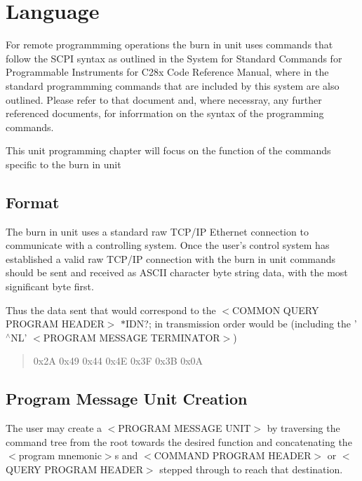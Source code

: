 \hypertarget{a00001_lang}{}\section{Language}\label{a00001_lang}
For remote programmming operations the burn in unit uses commands that follow the S\-C\-P\-I syntax as outlined in the System for Standard Commands for Programmable Instruments for C28x Code Reference Manual, where in the standard programmming commands that are included by this system are also outlined. Please refer to that document and, where necessray, any further referenced documents, for inforrmation on the syntax of the programming commands.

This unit programming chapter will focus on the function of the commands specific to the burn in unit\hypertarget{a00001_format}{}\subsection{Format}\label{a00001_format}
The burn in unit uses a standard raw T\-C\-P/\-I\-P Ethernet connection to communicate with a controlling system. Once the user's control system has established a valid raw T\-C\-P/\-I\-P connection with the burn in unit commands should be sent and received as A\-S\-C\-I\-I character byte string data, with the most significant byte first.

Thus the data sent that would correspond to the {\ttfamily $<$}C\-O\-M\-M\-O\-N Q\-U\-E\-R\-Y P\-R\-O\-G\-R\-A\-M H\-E\-A\-D\-E\-R{\ttfamily $>$} {\ttfamily $\ast$\-I\-D\-N}?; in transmission order would be (including the '$^\wedge$\-N\-L' {\ttfamily $<$}P\-R\-O\-G\-R\-A\-M M\-E\-S\-S\-A\-G\-E T\-E\-R\-M\-I\-N\-A\-T\-O\-R{\ttfamily $>$}) \begin{quotation}
{\ttfamily 0x2\-A 0x49 0x44 0x4\-E 0x3\-F 0x3\-B 0x0\-A}

\end{quotation}
\hypertarget{a00001_progcreation}{}\subsection{Program Message Unit Creation}\label{a00001_progcreation}
The user may create a {\ttfamily $<$}P\-R\-O\-G\-R\-A\-M M\-E\-S\-S\-A\-G\-E U\-N\-I\-T{\ttfamily $>$} by traversing the command tree from the root towards the desired function and concatenating the {\ttfamily $<$}program mnemonic{\ttfamily $>$}s and {\ttfamily $<$}C\-O\-M\-M\-A\-N\-D P\-R\-O\-G\-R\-A\-M H\-E\-A\-D\-E\-R{\ttfamily $>$} or {\ttfamily $<$}Q\-U\-E\-R\-Y P\-R\-O\-G\-R\-A\-M H\-E\-A\-D\-E\-R{\ttfamily $>$} stepped through to reach that destination.

